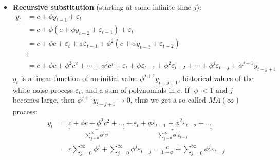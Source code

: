 \begin{enumerate}
\begin{itemize}
\item
\textbf{Recursive substitution} (starting at some infinite time \(j\)):
\begin{align*}
y_t &= c + \phi y_{t-1} + \varepsilon_t
\\
&= c + \phi \left( c + \phi y_{t-2} + \varepsilon_{t-1}\right) + \varepsilon_t
\\ 
&= c + \phi c + \varepsilon_t + \phi \varepsilon_{t-1} + \phi^2( c+ \phi y_{t-3} + \varepsilon_{t-2} )
\\
&\vdots
\\
& = c + \phi c + \phi^2 c^2 + \cdots + \phi^j c^j 
  + \varepsilon_t + \phi \varepsilon_{t-1} + \phi^2 \varepsilon_{t-2} + \cdots + \phi^j \varepsilon_{t-j}
  + \phi^{j+1} y_{t-{j+1}}
\end{align*}
\(y_t\) is a linear function of an initial value \(\phi^{j+1} y_{t-{j+1}}\),
historical values of the white noise process \(\varepsilon_t\), and a sum of polynomials in \(c\).
If \(|\phi|<1\) and \(j\) becomes large,
  then \( \phi^{j+1} y_{t-{j+1}} \rightarrow 0\),
  thus we get a so-called \(MA(\infty)\) process:
\begin{align*}
y_t &= \underbrace{c + \phi c + \phi^2 c^2 + \ldots}_{\sum_{j=0}^\infty \phi^j c^j} + \underbrace{\varepsilon_t + \phi \varepsilon_{t-1} + \phi^2 \varepsilon_{t-2} + \ldots}_{\sum_{j=0}^\infty \phi^j \varepsilon_{t-j}}
\\
&= c\sum_{j=0}^\infty \phi^j + \sum_{j=0}^\infty \phi^j \varepsilon_{t-j}
= \frac{c}{1-\phi} + \sum_{j=0}^\infty \phi^j \varepsilon_{t-j}
\end{align*}


\end{itemize}
\end{enumerate}
